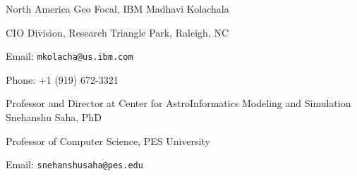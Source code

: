 

\begin{cventries}

  \cventry
    {North America Geo Focal, IBM} %
    {Madhavi Kolachala} %
    {} %
    {} %
    {
      \begin{cvitems}
      	\item {CIO Division, Research Triangle Park, Raleigh, NC}
      	\item {Email: \texttt{mkolacha@us.ibm.com}}
      	\item {Phone: +1 (919) 672-3321}
      \end{cvitems}
    }
    
  \cventry
    {Professor and Director at Center for AstroInformatics Modeling and Simulation} %
    {Snehanshu Saha, PhD} %
    {} %
    {} %
    {
      \begin{cvitems}
      	\item {Professor of Computer Science, PES University}
      	\item {Email: \texttt{snehanshusaha@pes.edu}}
      \end{cvitems}
    }


\end{cventries}
